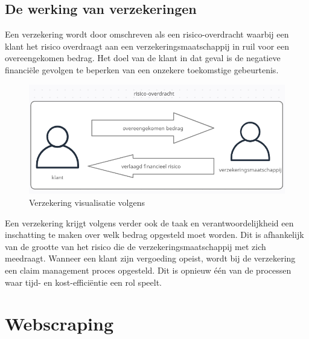 \subsection{De werking van verzekeringen}
Een verzekering wordt door \textcite{Trowbridge1975} omschreven als een risico-overdracht waarbij
een klant het risico overdraagt aan een verzekeringsmaatschappij in ruil voor een overeengekomen bedrag. 
Het doel van de klant in dat geval is de negatieve financiële gevolgen te beperken van een onzekere toekomstige gebeurtenis.
\graphicspath{ {./img/} }
\begin{figure}[H]
	\centering
	\includegraphics{creately_basic_verzekering}
	\caption{Verzekering visualisatie volgens \textcite{Trowbridge1975}}
\end{figure}
Een verzekering krijgt volgens \textcite{cortis2019insurtech} verder ook de taak en verantwoordelijkheid een inschatting te maken over welk bedrag opgesteld moet worden. Dit is afhankelijk van de grootte van het risico die de verzekeringsmaatschappij met zich meedraagt. Wanneer een klant zijn vergoeding opeist, wordt bij de verzekering een claim management proces opgesteld. Dit is opnieuw één van de processen waar tijd- en kost-efficiëntie een rol speelt.



\section{Webscraping}

